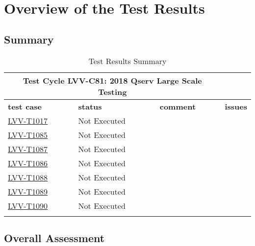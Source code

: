 \documentclass[DM,lsstdraft,STR,toc]{lsstdoc}
\begin{document}
\newpage

\section{Overview of the Test Results}
\label{sect:overview}

\subsection{Summary}
\label{sect:summarytable}

\begin{longtable}{p{}p{}p{}p{}}
\toprule

  \multicolumn{3}{c}{ Test Cycle {\bf LVV-C81: 2018 Qserv Large Scale Testing
 }} \\\hline

  {\bf \footnotesize test case} & {\bf \footnotesize status} & {\bf \footnotesize comment} & {\bf \footnotesize issues} \\\toprule

    \href{https://jira.lsstcorp.org/secure/Tests.jspa#/testCase/LVV-T1017}{LVV-T1017}
    & Not Executed &  &
    \\\hline
    \href{https://jira.lsstcorp.org/secure/Tests.jspa#/testCase/LVV-T1085}{LVV-T1085}
    & Not Executed &  &
    \\\hline
    \href{https://jira.lsstcorp.org/secure/Tests.jspa#/testCase/LVV-T1087}{LVV-T1087}
    & Not Executed &  &
    \\\hline
    \href{https://jira.lsstcorp.org/secure/Tests.jspa#/testCase/LVV-T1086}{LVV-T1086}
    & Not Executed &  &
    \\\hline
    \href{https://jira.lsstcorp.org/secure/Tests.jspa#/testCase/LVV-T1088}{LVV-T1088}
    & Not Executed &  &
    \\\hline
    \href{https://jira.lsstcorp.org/secure/Tests.jspa#/testCase/LVV-T1089}{LVV-T1089}
    & Not Executed &  &
    \\\hline
    \href{https://jira.lsstcorp.org/secure/Tests.jspa#/testCase/LVV-T1090}{LVV-T1090}
    & Not Executed &  &
    \\\hline

\caption{Test Results Summary}
\label{table:summary}
\end{longtable}

\subsection{Overall Assessment}
\label{sect:overallassessment}
\end{document}
